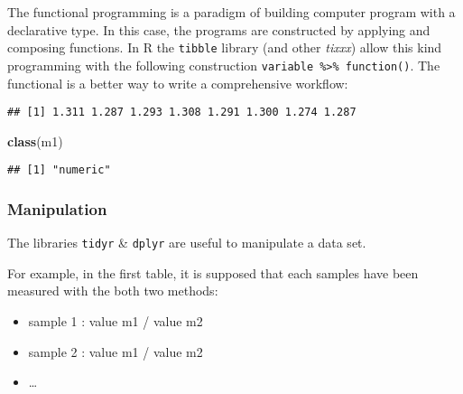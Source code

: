 \documentclass[
]{article}
\newenvironment{Shaded}{\begin{snugshade}}{\end{snugshade}}
\newcommand{\CommentTok}[1]{\textcolor[rgb]{0.56,0.35,0.01}{\textit{#1}}}
\newcommand{\FunctionTok}[1]{\textcolor[rgb]{0.13,0.29,0.53}{\textbf{#1}}}
\newcommand{\NormalTok}[1]{#1}
\newcommand{\OtherTok}[1]{\textcolor[rgb]{0.56,0.35,0.01}{#1}}
\newcommand{\SpecialCharTok}[1]{\textcolor[rgb]{0.81,0.36,0.00}{\textbf{#1}}}
\providecommand{\tightlist}{%
  \setlength{\itemsep}{0pt}\setlength{\parskip}{0pt}}
\begin{document}
The functional programming is a paradigm of building computer program
with a declarative type. In this case, the programs are constructed by
applying and composing functions. In R the \texttt{tibble} library (and
other \emph{tixxx}) allow this kind programming with the following
construction \texttt{variable\ \%\textgreater{}\%\ function()}. The
functional is a better way to write a comprehensive workflow:

\begin{Shaded}
\end{Shaded}

\begin{verbatim}
## [1] 1.311 1.287 1.293 1.308 1.291 1.300 1.274 1.287
\end{verbatim}

\begin{Shaded}
\begin{Highlighting}[]
\FunctionTok{class}\NormalTok{(m1)}
\end{Highlighting}
\end{Shaded}

\begin{verbatim}
## [1] "numeric"
\end{verbatim}

\hypertarget{manipulation}{%
\subsubsection{Manipulation}\label{manipulation}}

The libraries \texttt{tidyr} \& \texttt{dplyr} are useful to manipulate
a data set.

For example, in the first table, it is supposed that each samples have
been measured with the both two methods:

\begin{itemize}
\tightlist
\item
  sample 1 : value m1 / value m2
\item
  sample 2 : value m1 / value m2
\item
  \ldots{}
\end{itemize}
\end{document}
